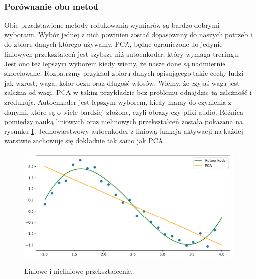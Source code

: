 \documentclass[a4paper,12pt]{book} %
\begin{document}
\subsubsection{Porównanie obu metod}
Obie przedstawione metody redukowania wymiarów są bardzo dobrymi wyborami. Wybór jednej z nich powinien zostać dopasowany do naszych potrzeb i do zbioru danych którego używamy. PCA, będąc ograniczone do jedynie liniowych przekształceń jest szybsze niż autoenkoder, który wymaga treningu. Jest ono też lepszym wyborem kiedy wiemy, że nasze dane są nadmiernie skorelowane. Rozpatrzmy przykład zbioru danych opisującego takie cechy ludzi jak wzrost, waga, kolor oczu oraz długość włosów. Wiemy, że czyjaś waga jest zależna od wagi. PCA w takim przykładzie bez problemu odnajdzie tą zależność i zredukuje. Autoenkoder jest lepszym wyborem, kiedy mamy do czynienia z danymi, które są o wiele bardziej złożone, czyli obrazy czy pliki audio. Różnica pomiędzy nauką liniowych oraz nielinowych przekształceń została pokazana na rysunku \ref{fig:pcavsautoenkoder}.  
Jednowarstwowy autoenkoder z liniową funkcja aktywacji na każdej warstwie zachowuje się dokładnie tak samo jak PCA.\cite{aevspca}
\begin{figure}[h!]
	\centering
	\includegraphics[width=14cm]{pcavsautoencoder.pdf}
	\label{fig:pcavsautoenkoder}
	\caption{Liniowe i nieliniowe przekształcenie.}
\end{figure}
\end{document}
